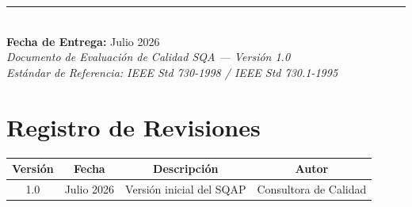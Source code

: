 \begin{titlepage}
\begin{center}
    
    \vfill
    
    \textcolor{AccentColor}{\rule{0.6\textwidth}{1pt}}\\[0.3cm]
    {\large \textcolor{EspeColor}{\textbf{Fecha de Entrega:}} Julio 2026}\\[0.1cm]
    {\small \textcolor{EspeColor}{\textit{Documento de Evaluación de Calidad SQA --- Versión 1.0}}}\\[0.1cm]
    {\small \textcolor{EspeColor}{\textit{Estándar de Referencia: IEEE Std 730-1998 / IEEE Std 730.1-1995}}}

\end{center}
\end{titlepage}

\chapter*{Registro de Revisiones}

\begin{longtable}{cccc}
\toprule
\textbf{Versión} & \textbf{Fecha} & \textbf{Descripción} & \textbf{Autor}\\
\midrule
1.0 & Julio 2026 & Versión inicial del SQAP & Consultora de Calidad\\
\bottomrule
\end{longtable}

\newpage

\tableofcontents
\newpage
